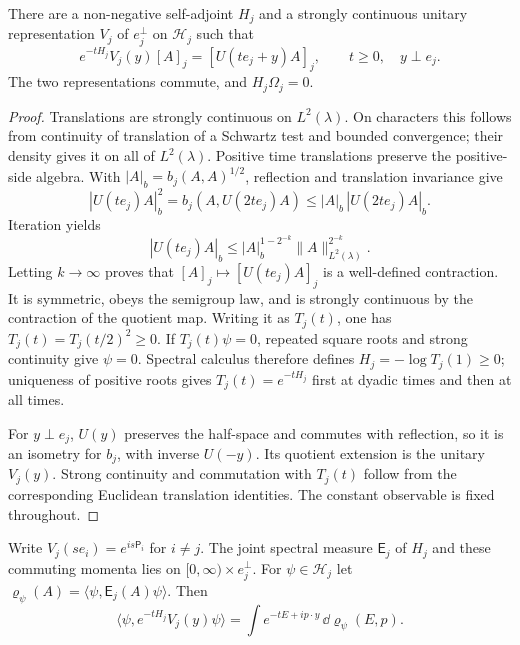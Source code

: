 \begin{proposition}\label{prop:axis-reconstruction}
There are a non-negative self-adjoint $H_j$ and a strongly continuous
unitary representation $V_j$ of $e_j^\perp$ on $\mathcal H_j$ such
that
\begin{equation}\label{eq:axis-semigroup}
 e^{-tH_j}V_j(y)[A]_j=[U(te_j+y)A]_j,
 \qquad t\ge0,\quad y\perp e_j.
\end{equation}
The two representations commute, and $H_j\Omega_j=0$.
\end{proposition}

\begin{proof}
Translations are strongly continuous on $L^2(\lambda)$. On
characters this follows from continuity of translation of a Schwartz
test and bounded convergence; their density gives it on all of
$L^2(\lambda)$. Positive time translations preserve the positive-side
algebra. With $|A|_b=b_j(A,A)^{1/2}$, reflection and translation
invariance give
\[
 |U(te_j)A|_b^2=b_j(A,U(2te_j)A)
 \le |A|_b\,|U(2te_j)A|_b.
\]
Iteration yields
\[
 |U(te_j)A|_b
 \le |A|_b^{1-2^{-k}}\|A\|_{L^2(\lambda)}^{2^{-k}}.
\]
Letting $k\to\infty$ proves that $[A]_j\mapsto[U(te_j)A]_j$
is a well-defined contraction. It is symmetric, obeys the semigroup
law, and is strongly continuous by the contraction of the quotient
map. Writing it as $T_j(t)$, one has
$T_j(t)=T_j(t/2)^2\ge0$. If $T_j(t)\psi=0$, repeated square roots
and strong continuity give $\psi=0$. Spectral calculus therefore
defines $H_j=-\log T_j(1)\ge0$; uniqueness of positive roots gives
$T_j(t)=e^{-tH_j}$ first at dyadic times and then at all times.

For $y\perp e_j$, $U(y)$ preserves the half-space and commutes with
reflection, so it is an isometry for $b_j$, with inverse $U(-y)$.
Its quotient extension is the unitary $V_j(y)$. Strong continuity
and commutation with $T_j(t)$ follow from the corresponding Euclidean
translation identities. The constant observable is fixed throughout.
\end{proof}

Write $V_j(se_i)=e^{is\mathsf P_i}$ for $i\ne j$. The joint spectral
measure $\mathsf E_j$ of $H_j$ and these commuting momenta lies on
$[0,\infty)\times e_j^\perp$. For $\psi\in\mathcal H_j$ let
$\varrho_\psi(A)=\langle\psi,\mathsf E_j(A)\psi\rangle$.
Then
\begin{equation}\label{eq:joint-spectral-integral}
 \langle\psi,e^{-tH_j}V_j(y)\psi\rangle
 =\int e^{-tE+ip\cdot y}\,\dd\varrho_\psi(E,p).
\end{equation}

